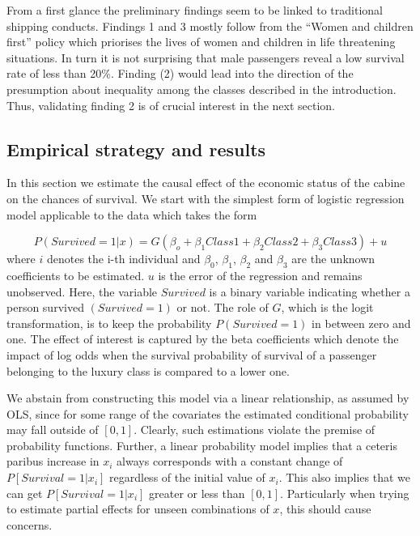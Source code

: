 \documentclass[
]{article}
\begin{document}
From a first glance the preliminary findings seem to be linked to
traditional shipping conducts. Findings 1 and 3 mostly follow from the
``Women and children first'' policy which priorises the lives of women
and children in life threatening situations. In turn it is not
surprising that male passengers reveal a low survival rate of less than
20\%. Finding (2) would lead into the direction of the presumption about
inequality among the classes described in the introduction. Thus,
validating finding 2 is of crucial interest in the next section.

\hypertarget{empirical-strategy-and-results}{%
\subsection{Empirical strategy and
results}\label{empirical-strategy-and-results}}

In this section we estimate the causal effect of the economic status of
the cabine on the chances of survival. We start with the simplest form
of logistic regression model applicable to the data which takes the form

\[P(Survived = 1|x)= G(\beta_o + \beta_1Class1 + \beta_2Class2 + \beta_3Class3) + u\]
where \(i\) denotes the i-th individual and \(\beta_0\), \(\beta_1\),
\(\beta_2\) and \(\beta_3\) are the unknown coefficients to be
estimated. \(u\) is the error of the regression and remains unobserved.
Here, the variable \(Survived\) is a binary variable indicating whether
a person survived \((Survived = 1)\) or not. The role of \(G\), which is
the logit transformation, is to keep the probability \(P(Survived = 1)\)
in between zero and one. The effect of interest is captured by the beta
coefficients which denote the impact of log odds when the survival
probability of survival of a passenger belonging to the luxury class is
compared to a lower one.

We abstain from constructing this model via a linear relationship, as
assumed by OLS, since for some range of the covariates the estimated
conditional probability may fall outside of \([0,1]\). Clearly, such
estimations violate the premise of probability functions. Further, a
linear probability model implies that a ceteris paribus increase in
\(x_i\) always corresponds with a constant change of
\(P[Survival=1|x_i]\) regardless of the initial value of \(x_i\). This
also implies that we can get \(P[Survival=1|x_i]\) greater or less than
\([0,1]\). Particularly when trying to estimate partial effects for
unseen combinations of \(x\), this should cause concerns.
\end{document}
